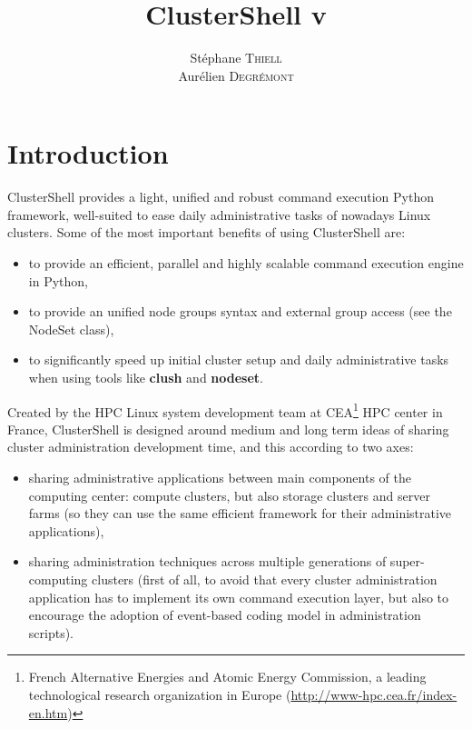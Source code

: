 \documentclass[english,a4paper]{csuserguide}
\title{ClusterShell v\version}
\author{St\'ephane \textsc{Thiell}\\
Aur\'elien \textsc{Degr\'emont}
}
\begin{document}
\parskip 7.2pt

\maketitle

\fancyfoot[C]{\thepage}

\tableofcontents

\parskip 10.8pt

\section*{Introduction}

\indent ClusterShell provides a light, unified and robust command execution Python framework, well-suited to ease daily administrative tasks of nowadays Linux clusters. Some of the most important benefits of using ClusterShell are:
\begin{itemize}
\item{to provide an efficient, parallel and highly scalable command execution engine in Python,}
\item{to provide an unified node groups syntax and external group access (see the NodeSet class),}
\item{to significantly speed up initial cluster setup and daily administrative tasks when using tools like \textbf{clush} and \textbf{nodeset}.}
\end{itemize}

Created by the HPC Linux system development team at CEA\footnote{French Alternative Energies and Atomic Energy Commission, a leading technological research organization in Europe (\url{http://www-hpc.cea.fr/index-en.htm})} HPC center in France, ClusterShell is designed around medium and long term ideas of sharing cluster administration development time, and this according to two axes:
\begin{itemize}
\item{sharing administrative applications between main components of the computing center: compute clusters, but also storage clusters and server farms (so they can use the same efficient framework for their administrative applications),}
\item{sharing administration techniques across multiple generations of super-computing clusters (first of all, to avoid that every cluster administration application has to implement its own command execution layer, but also to encourage the adoption of event-based coding model in administration scripts).}
\end{itemize}
\end{document}
